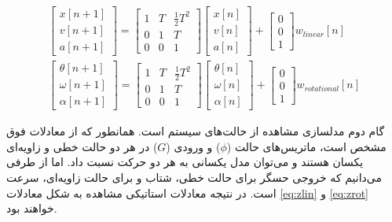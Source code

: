 \begin{gather}
	\begin{bmatrix}
		x[n+1] \\
		v[n+1] \\
		a[n+1]
	\end{bmatrix}
	=
	\begin{bmatrix}
		1 & T & \frac{1}{2}T^2 \\
		0 & 1 & T \\
		0 & 0 & 1
	\end{bmatrix}
	\begin{bmatrix}
		x[n] \\
		v[n] \\
		a[n]
	\end{bmatrix}
	+
	\begin{bmatrix}
		0 \\
		0 \\
		1
	\end{bmatrix}
	w_{linear}[n]
	\label{eq:sslin} \\
	\begin{bmatrix}
		\theta[n+1] \\
		\omega[n+1] \\
		\alpha[n+1]
	\end{bmatrix}
	=
	\begin{bmatrix}
		1 & T & \frac{1}{2}T^2 \\
		0 & 1 & T \\
		0 & 0 & 1
	\end{bmatrix}
	\begin{bmatrix}
		\theta[n] \\
		\omega[n] \\
		\alpha[n]
	\end{bmatrix}
	+
	\begin{bmatrix}
		0 \\
		0 \\
		1
	\end{bmatrix}
	w_{rotational}[n]
	\label{eq:ssrot}
\end{gather}

گام دوم مدلسازی مشاهده از حالت‌های سیستم است. همانطور که از معادلات فوق مشخص است، ماتریس‌های حالت ($\phi$) و ورودی ($G$) در هر دو حالت خطی و زاویه‌ای یکسان هستند و می‌توان مدل یکسانی به هر دو حرکت نسبت داد. اما از طرفی می‌دانیم که خروجی حسگر برای حالت خطی، شتاب و برای حالت زاویه‌ای، سرعت است. در نتیجه معادلات استاتیکی مشاهده به شکل معادلات \ref{eq:zlin} و \ref{eq:zrot} خواهند بود.

